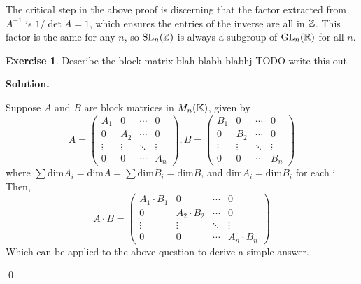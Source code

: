 \documentclass[12pt]{book}
\theoremstyle{definition}
\newtheorem{exercise}{Exercise}[chapter]
\newenvironment{solution}
{%
  \par\noindent\textbf{Solution.}\quad
}
{%
  \qed\par
}
\begin{document}
The critical step in the above proof is discerning that the factor extracted from $A^{-1}$ is $1/\det A = 1$, which ensures the entries of the inverse are all in $\mathbb{Z}$.
This factor is the same for any $n$, so $\mathrm{SL}_{n}(\mathbb{Z})$ is always a subgroup of $\mathrm{GL}_{n}(\mathbb{R})$ for all $n$.


\begin{exercise}
  Describe the block matrix blah blabh blabhj TODO write this out
\end{exercise}
\begin{solution}
  Suppose $A$ and $B$ are block matrices in $M_n(\mathbb{K})$, given by
  \[
A = \begin{pmatrix}
A_1 & 0   & \cdots & 0 \\
0   & A_2 & \cdots & 0 \\
\vdots & \vdots & \ddots & \vdots \\
0   & 0   & \cdots & A_n
\end{pmatrix},
B = \begin{pmatrix}
  B_1 & 0   & \cdots & 0 \\
  0   & B_2 & \cdots & 0 \\
  \vdots & \vdots & \ddots & \vdots \\
  0   & 0   & \cdots & B_n
  \end{pmatrix}
\]
where $\sum \text{dim}A_i = \text{dim}A = \sum \text{dim}B_i = \text{dim}B$, and $\text{dim} A_i = \text{dim}B_i$ for each i.
Then,
\[
  A \cdot B = \begin{pmatrix}
    A_1\cdot B_1 & 0   & \cdots & 0 \\
    0   & A_2 \cdot B_2 & \cdots & 0 \\
    \vdots & \vdots & \ddots & \vdots \\
    0   & 0   & \cdots & A_n \cdot B_n
    \end{pmatrix}
\]
Which can be applied to the above question to derive a simple answer.

\end{solution}
\end{document}
